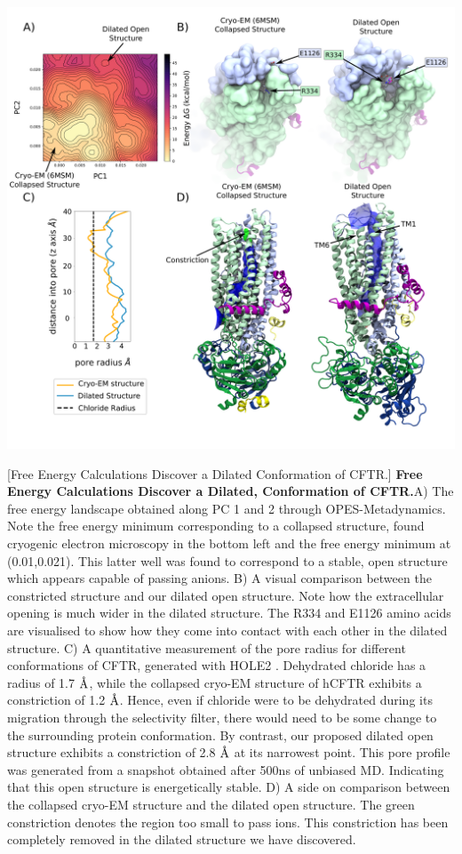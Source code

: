 	\begin{center}
		\includegraphics[width=1\textwidth]{figures/opening/summary_dilated_structure_1.pdf}
	\end{center}
	\begingroup
	\captionsetup{singlelinecheck = false, justification=raggedright}
	[Free Energy Calculations Discover a Dilated Conformation of CFTR.] {\textbf{Free Energy Calculations Discover a Dilated, Conformation of CFTR.}}{A) The free energy landscape obtained along PC 1 and 2 through OPES-Metadynamics. Note the free energy minimum corresponding to a collapsed structure, found cryogenic electron microscopy in the bottom left and the free energy minimum at (0.01,0.021). This latter well was found to correspond to a stable, open structure which appears capable of passing anions. B) A visual comparison between the constricted structure and our dilated open structure. Note how the extracellular opening is much wider in the dilated structure. The R334 and E1126 amino acids are visualised to show how they come into contact with each other in the dilated structure. C) A quantitative measurement of the pore radius for different conformations of CFTR, generated with HOLE2 \cite{smart1996}. Dehydrated chloride has a radius of 1.7 $\textup{\AA}$, while the collapsed cryo-EM structure of hCFTR exhibits a constriction of 1.2 $\textup{\AA}$. Hence, even if chloride were to be dehydrated during its migration through the selectivity filter, there would need to be some change to the surrounding protein conformation. By contrast, our proposed dilated open structure exhibits a constriction of 2.8 $\textup{\AA}$ at its  narrowest point. This pore profile was generated from a snapshot obtained after 500ns of unbiased MD. Indicating that this open structure is energetically stable.  D) A side on comparison between the collapsed cryo-EM structure and the dilated open structure. The green constriction denotes the region too small to pass ions. This constriction has been completely removed in the dilated structure we have discovered. }
	\label{summary_FES}
	\endgroup



